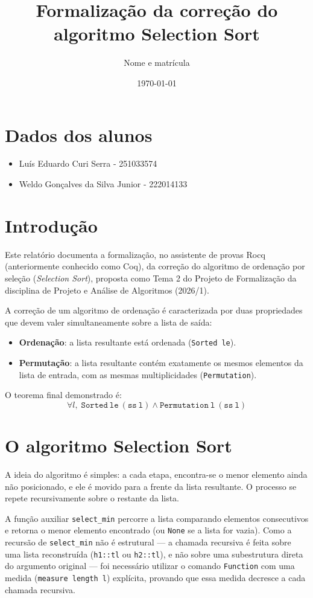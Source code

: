 \documentclass{article}
\title{Formalização da correção do algoritmo Selection Sort}
\author{Nome e matrícula}
\date{\today}
\begin{document}
\maketitle
\section{Dados dos alunos}
\begin{itemize}
      \item Luís Eduardo Curi Serra  - 251033574
      \item Weldo Gonçalves da Silva Junior - 222014133
\end{itemize}
\section{Introdução}

Este relatório documenta a formalização, no assistente de provas Rocq (anteriormente
conhecido como Coq), da correção do algoritmo de ordenação por seleção
(\emph{Selection Sort}), proposta como Tema 2 do Projeto de Formalização da
disciplina de Projeto e Análise de Algoritmos (2026/1).

A correção de um algoritmo de ordenação é caracterizada por duas propriedades
que devem valer simultaneamente sobre a lista de saída:

\begin{itemize}
  \item \textbf{Ordenação}: a lista resultante está ordenada (\texttt{Sorted le}).
  \item \textbf{Permutação}: a lista resultante contém exatamente os mesmos
        elementos da lista de entrada, com as mesmas multiplicidades
        (\texttt{Permutation}).
\end{itemize}

O teorema final demonstrado é:
\[
\forall l,\; \mathtt{Sorted\ le\ (ss\ l)} \land \mathtt{Permutation\ l\ (ss\ l)}
\]

\section{O algoritmo Selection Sort}

A ideia do algoritmo é simples: a cada etapa, encontra-se o menor elemento
ainda não posicionado, e ele é movido para a frente da lista resultante. O
processo se repete recursivamente sobre o restante da lista.

A função auxiliar \texttt{select\_min} percorre a lista comparando elementos
consecutivos e retorna o menor elemento encontrado (ou \texttt{None} se a
lista for vazia). Como a recursão de \texttt{select\_min} não é estrutural —
a chamada recursiva é feita sobre uma lista reconstruída (\texttt{h1::tl} ou
\texttt{h2::tl}), e não sobre uma subestrutura direta do argumento original —
foi necessário utilizar o comando \texttt{Function} com uma medida
(\texttt{measure length l}) explícita, provando que essa medida decresce a
cada chamada recursiva.
\end{document}
